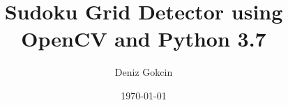 \newcommand{\mytitle}{Sudoku Grid Detector using OpenCV and Python 3.7}
\newcommand{\myauthor}{Deniz Gokcin}

\title{\mytitle}
\author{\myauthor}
\date{\today}
